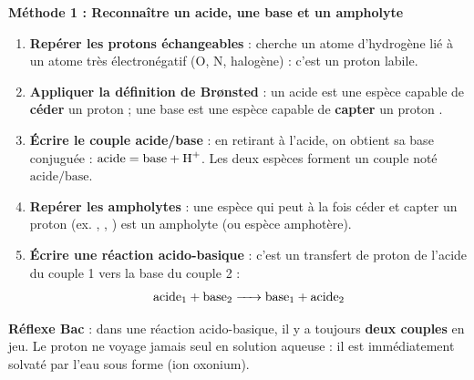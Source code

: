 \documentclass[11pt]{article}
\newcommand{\cle}[1]{{\popxbold\color{popdark}#1}}
\begin{document}
\textbf{Méthode 1 : Reconnaître un acide, une base et un ampholyte}\par
\begin{methode}
\begin{enumerate}
\item \textbf{Repérer les protons échangeables} : cherche un atome d'hydrogène lié à un atome très électronégatif (O, N, halogène) : c'est un \cle{proton labile}.
\item \textbf{Appliquer la définition de Brønsted} : un \cle{acide} est une espèce capable de \textbf{céder} un proton  ; une \cle{base} est une espèce capable de \textbf{capter} un proton .
\item \textbf{Écrire le couple acide/base} : en retirant  à l'acide, on obtient sa base conjuguée : $\text{acide} = \text{base} + \ce{H+}$. Les deux espèces forment un \cle{couple} noté $\text{acide}/\text{base}$.
\item \textbf{Repérer les ampholytes} : une espèce qui peut à la fois céder et capter un proton (ex. , , ) est un \cle{ampholyte} (ou espèce amphotère).
\item \textbf{Écrire une réaction acido-basique} : c'est un transfert de proton de l'acide du couple 1 vers la base du couple 2 :
\[ \text{acide}_1 + \text{base}_2 \ce{->} \text{base}_1 + \text{acide}_2 \]
\end{enumerate}
\textbf{Réflexe Bac} : dans une réaction acido-basique, il y a toujours \textbf{deux couples} en jeu. Le proton ne voyage jamais seul en solution aqueuse : il est immédiatement solvaté par l'eau sous forme  (ion oxonium).
\end{methode}
\end{document}
